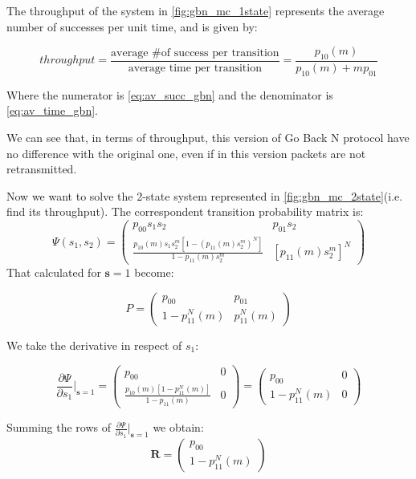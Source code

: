 The throughput of the system in \autoref{fig:gbn_mc_1state} represents the average number of successes per unit time, and is given by:

\begin{equation}\label{eq:thr_1state_gbn}
	throughput = \frac{\text{average \# of success per transition}}{\text{average time per transition}} = \frac{p_{10}(m)}{p_{10}(m) + mp_{01}}
\end{equation}

Where the numerator is \autoref{eq:av_succ_gbn} and the denominator is \autoref{eq:av_time_gbn}.

We can see that, in terms of throughput, this version of Go Back N protocol have no difference with the original one, even if in this version packets are not retransmitted.

Now we want to solve the 2-state system represented in \autoref{fig:gbn_mc_2state}(i.e. find its throughput).
The correspondent transition probability matrix is:
\begin{equation*}
	\Psi(s_1,s_2) =
	\begin{pmatrix}
		p_{00}s_1s_2 & p_{01}s_2 \\
		\frac{p_{10}(m)s_1s_2^m[1-(p_{11}(m)s_2^m)^N]}{1-p_{11}(m)s_2^m} & [p_{11}(m)s_2^m]^N
	\end{pmatrix}
\end{equation*}
That calculated for $\mathbf{s} = 1$ become:

\begin{equation*}
	P =
	\begin{pmatrix}
		p_{00} & p_{01} \\
		1-p_{11}^N(m) & p_{11}^N(m)
	\end{pmatrix}
\end{equation*}

We take the derivative in respect of $s_1$:

\begin{equation*}
	\frac{\partial\Psi}{\partial s_1}\bigg|_{\mathbf{s} = 1} =
	\begin{pmatrix}
		p_{00} & 0\\
		\frac{p_{10}(m)[1-p_{11}^N(m)]}{1-p_{11}(m)} & 0
	\end{pmatrix} =
	\begin{pmatrix}
		p_{00} & 0\\
		1-p_{11}^N(m) & 0
	\end{pmatrix}
\end{equation*}

Summing the rows of $\frac{\partial\Psi}{\partial s_1}\bigg|_{\mathbf{s} = 1}$ we obtain:
\begin{equation}
	\mathbf{R} =
	\begin{pmatrix}
		p_{00} \\
		1-p_{11}^N(m)
	\end{pmatrix}
\end{equation}

